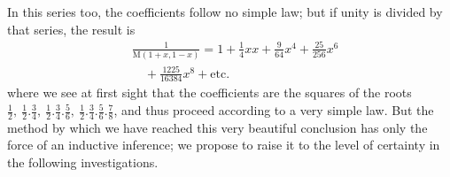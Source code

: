 In this series too, the coefficients follow no simple law; but if unity is divided by
that series, the result is
\[
\begin{aligned}&\frac1{\mathrm{M}(1+x,1-x)}=1+\frac14xx+\frac9{64}x^4+\frac{25}{256}x^6\\&\quad+\frac{1225}{16384}x^8+\text{etc.}\end{aligned}
\]
where we see at first sight that the coefficients are the squares of the roots
\(\frac12,\allowbreak \ \frac12.\frac34,\allowbreak \ \frac12.\frac34.\frac56,\allowbreak \ \frac12.\frac34.\frac56.\frac78\),
and thus proceed according to a very simple law. But the method by
which we have reached this very beautiful conclusion has only the force
of an inductive inference; we propose to raise it to the level of certainty
in the following investigations.

\clearpage
\endgroup
